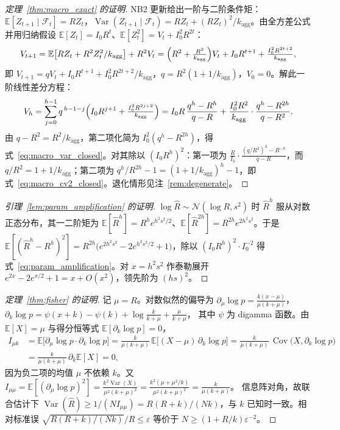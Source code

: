 \documentclass[10pt,UTF8,a4paper,zihao=-4]{ctexart}
\theoremstyle{plain}
\theoremstyle{definition}
\theoremstyle{remark}
\begin{document}
\begin{proof}[定理~\ref{thm:macro_exact} 的证明]
NB2 更新给出一阶与二阶条件矩：$\mathbb{E}[Z_{t+1}\mid\mathcal{F}_t] = R Z_t$，$\operatorname{Var}(Z_{t+1}\mid\mathcal{F}_t) = R Z_t + (R Z_t)^2/k_{\text{agg}}$。由全方差公式并用归纳假设 $\mathbb{E}[Z_t] = I_0 R^t$、$\mathbb{E}[Z_t^2] = V_t + I_0^2 R^{2t}$：
\[
V_{t+1} = \mathbb{E}\bigl[R Z_t + R^2 Z_t^2/k_{\text{agg}}\bigr] + R^2 V_t
= \Bigl(R^2 + \tfrac{R^2}{k_{\text{agg}}}\Bigr) V_t + I_0 R^{t+1} + \tfrac{I_0^2 R^{2t+2}}{k_{\text{agg}}},
\]
即 $V_{t+1} = q V_t + I_0 R^{t+1} + I_0^2 R^{2t+2}/k_{\text{agg}}$，$q = R^2(1+1/k_{\text{agg}})$，$V_0=0$。解此一阶线性差分方程：
\[
V_h = \sum_{j=0}^{h-1} q^{\,h-1-j}\Bigl(I_0 R^{j+1} + \tfrac{I_0^2 R^{2j+2}}{k_{\text{agg}}}\Bigr)
= I_0 R\,\frac{q^h - R^h}{q - R} + \frac{I_0^2 R^2}{k_{\text{agg}}}\cdot\frac{q^h - R^{2h}}{q - R^2}.
\]
由 $q - R^2 = R^2/k_{\text{agg}}$，第二项化简为 $I_0^2 (q^h - R^{2h})$，得式~\eqref{eq:macro_var_closed}。对其除以 $(I_0 R^h)^2$：第一项为 $\frac{R}{I_0}\cdot\frac{(q/R^2)^h - R^{-h}}{q-R}$，而 $q/R^2 = 1+1/k_{\text{agg}}$；第二项为 $q^h/R^{2h} - 1 = (1+1/k_{\text{agg}})^h - 1$，即式~\eqref{eq:macro_cv2_closed}。退化情形见注~\ref{rem:degenerate}。
\end{proof}

\begin{proof}[引理~\ref{lem:param_amplification} 的证明]
$\log\hat R \sim \mathcal{N}(\log R, s^2)$ 时 $\hat R^h$ 服从对数正态分布，其一二阶矩为 $\mathbb{E}[\hat R^h] = R^h e^{h^2 s^2/2}$、$\mathbb{E}[\hat R^{2h}] = R^{2h} e^{2h^2 s^2}$。于是
$\mathbb{E}[(\hat R^h - R^h)^2] = R^{2h}\bigl(e^{2h^2s^2} - 2e^{h^2s^2/2} + 1\bigr)$，除以 $(I_0 R^h)^2 \cdot I_0^{-2}$ 得式~\eqref{eq:param_amplification}。对 $x = h^2 s^2$ 作泰勒展开 $e^{2x} - 2e^{x/2} + 1 = x + O(x^2)$，领先阶为 $(hs)^2$。
\end{proof}

\begin{proof}[定理~\ref{thm:fisher} 的证明]
记 $\mu = R$。对数似然的偏导为
$\partial_\mu \log p = \frac{k(x-\mu)}{\mu(k+\mu)}$，
$\partial_k \log p = \psi(x+k) - \psi(k) + \log\frac{k}{k+\mu} + \frac{\mu}{k+\mu}$，
其中 $\psi$ 为 digamma 函数。由 $\mathbb{E}[X] = \mu$ 与得分恒等式 $\mathbb{E}[\partial_k\log p] = 0$，
\begin{align*}
I_{\mu k} &= \mathbb{E}\bigl[\partial_\mu \log p \cdot \partial_k \log p\bigr]
= \frac{k}{\mu(k+\mu)}\,\mathbb{E}\bigl[(X-\mu)\,\partial_k \log p\bigr]
= \frac{k}{\mu(k+\mu)}\,\operatorname{Cov}\bigl(X, \partial_k \log p\bigr)\\
&= \frac{k}{\mu(k+\mu)}\,\partial_k \mathbb{E}[X] = 0,
\end{align*}
因为负二项的均值 $\mu$ 不依赖 $k$。又
$I_{\mu\mu} = \mathbb{E}[(\partial_\mu\log p)^2] = \frac{k^2\operatorname{Var}(X)}{\mu^2(k+\mu)^2} = \frac{k^2(\mu + \mu^2/k)}{\mu^2(k+\mu)^2} = \frac{k}{\mu(k+\mu)}$。
信息阵对角，故联合估计下 $\operatorname{Var}(\hat R) \ge 1/(N I_{\mu\mu}) = R(R+k)/(Nk)$，与 $k$ 已知时一致。相对标准误 $\sqrt{R(R+k)/(Nk)}/R \le \varepsilon$ 等价于 $N \ge (1 + R/k)\varepsilon^{-2}$。\end{proof}
\end{document}
